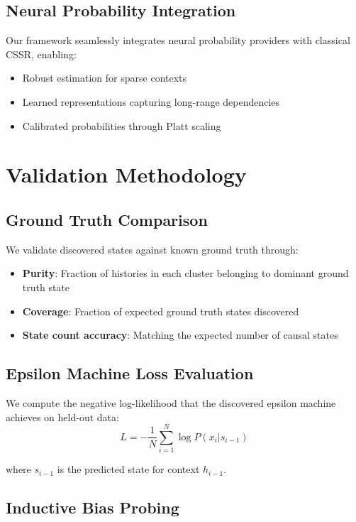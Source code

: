 \documentclass[12pt]{article}
\begin{document}
\subsection{Neural Probability Integration}

Our framework seamlessly integrates neural probability providers with classical CSSR, enabling:
\begin{itemize}
    \item Robust estimation for sparse contexts
    \item Learned representations capturing long-range dependencies
    \item Calibrated probabilities through Platt scaling
\end{itemize}

\section{Validation Methodology}

\subsection{Ground Truth Comparison}

We validate discovered states against known ground truth through:
\begin{itemize}
    \item \textbf{Purity}: Fraction of histories in each cluster belonging to dominant ground truth state
    \item \textbf{Coverage}: Fraction of expected ground truth states discovered
    \item \textbf{State count accuracy}: Matching the expected number of causal states
\end{itemize}

\subsection{Epsilon Machine Loss Evaluation}

We compute the negative log-likelihood that the discovered epsilon machine achieves on held-out data:
$$L = -\frac{1}{N} \sum_{i=1}^N \log P(x_i | s_{i-1})$$

where $s_{i-1}$ is the predicted state for context $h_{i-1}$.

\subsection{Inductive Bias Probing}
\end{document}

